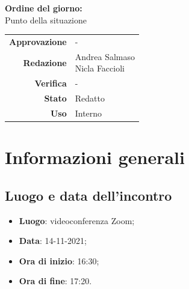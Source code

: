\documentclass[11pt]{article}
\begin{document}
\begin{titlepage}
\begin{center}
			\large
			
			\vfill
			\textbf{Ordine del giorno:} \\
			Punto della situazione
			
			
			\vfill
			
			
			\begin{tabular}{r|l}
				\textbf{Approvazione} &  -\\
				\textbf{Redazione} &  \parbox[t]{5cm}{Andrea Salmaso \\Nicla Faccioli}\\
				\textbf{Verifica} &  -\\
				\textbf{Stato} & Redatto \\
				\textbf{Uso} & Interno
			\end{tabular}
			\vfill
			
		\end{center}
	\end{titlepage}

	\section{Informazioni generali}
	\subsection{Luogo e data dell'incontro}
	\begin{itemize}
		\item \textbf{Luogo}: videoconferenza Zoom;
		\item \textbf{Data}: 14-11-2021;
		\item \textbf{Ora di inizio}: 16:30;
		\item \textbf{Ora di fine}: 17:20.
	\end{itemize}
	
\end{document}
